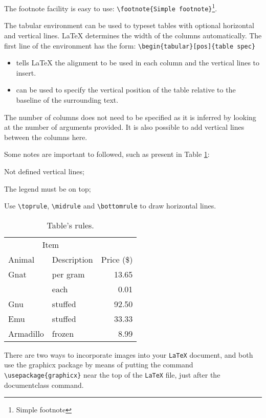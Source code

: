 The footnote facility is easy to use: \verb!\footnote{Simple footnote}!\footnote{Simple footnote}. 

The tabular environment can be used to typeset tables with optional horizontal and vertical lines. LaTeX determines the width of the columns automatically. The first line of the environment has the form: \verb!\begin{tabular}[pos]{table spec}!

\begin{itemize}
\item[table spec] tells LaTeX the alignment to be used in each column and the vertical lines to insert.
\item[pos] can be used to specify the vertical position of the table relative to the baseline of the surrounding text. 
\end{itemize}

The number of columns does not need to be specified as it is inferred by looking at the number of arguments provided. It is also possible to add vertical lines between the columns here. 

Some notes are important to followed, such as present in Table \ref{tab:results}: 
\begin{asparaenum}[i)]
	\item Not defined vertical lines;
	\item The legend must be on top;
	\item Use \verb!\toprule!, \verb!\midrule! and \verb!\bottomrule! to draw horizontal lines.
\end{asparaenum}
 
\begin{table}[ht]
	\caption{Table's rules.}
	\label{tab:results}
\centering
\begin{tabular}{llr}
\toprule
\multicolumn{2}{c}{Item} \\
\cmidrule(r){1-2}
Animal & Description & Price (\$) 
\\
\midrule
Gnat  & per gram & 13.65 \\
      & each     &  0.01 \\
Gnu   & stuffed  & 92.50 \\
Emu   & stuffed  & 33.33 \\
Armadillo & frozen & 8.99 \\
\bottomrule
\end{tabular}
\end{table}

There are two ways to incorporate images into your \texttt{LaTeX} document, and both use the graphicx package by means of putting the command  \verb!\usepackage{graphicx}!  near the top of the \texttt{LaTeX} file, just after the documentclass command.

